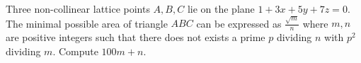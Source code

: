 Three non-collinear lattice points $A,B,C$ lie on the plane $1+3x+5y+7z=0$. The minimal possible area of triangle $ABC$ can be expressed as $\frac{\sqrt{m}}{n}$ where $m,n$ are positive integers such that there does not exists a prime $p$ dividing $n$ with $p^2$ dividing $m$. Compute $100m+n$.
